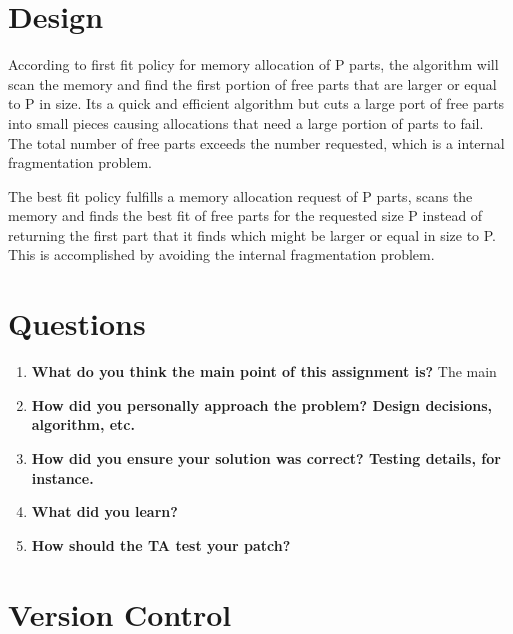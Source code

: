 \documentclass[onecolumn, draftclsnofoot,10pt, compsoc]{IEEEtran}
\begin{document}


\section{Design}
According to first fit policy for memory allocation of P parts, the algorithm will scan the memory and find the first portion of free parts that are larger or equal to P in size. Its a quick and efficient algorithm but cuts a large port of free parts into small pieces causing allocations that need a large portion of parts to fail. The total number of free parts exceeds the number requested, which is a internal fragmentation problem. 

The best fit policy fulfills a memory allocation request of P parts, scans the memory and finds the best fit of free parts for the requested size P instead of returning the first part that it finds which might be larger or equal in size to P. This is accomplished by avoiding the internal fragmentation problem. 

\section{Questions}

\begin{enumerate}
\item \textbf{What do you think the main point of this assignment is?}
	The main

\item \textbf{How did you personally approach the problem? Design decisions, algorithm, etc.}

\item \textbf{How did you ensure your solution was correct? Testing details, for instance.}

\item \textbf{What did you learn?}

\item \textbf{How should the TA test your patch?}

\end{enumerate}

\section{Version Control}
\end{document}
